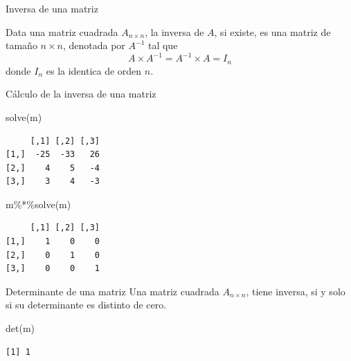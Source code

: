 \documentclass[
  ignorenonframetext,
  aspectratio=169,
  spanish,
]{beamer}
\newenvironment{Shaded}{\begin{snugshade}}{\end{snugshade}}
\newcommand{\FunctionTok}[1]{\textcolor[rgb]{0.28,0.35,0.67}{#1}}
\newcommand{\NormalTok}[1]{\textcolor[rgb]{0.00,0.23,0.31}{#1}}
\newcommand{\SpecialCharTok}[1]{\textcolor[rgb]{0.37,0.37,0.37}{#1}}
\begin{document}
\begin{frame}[fragile]{Inversa de una matriz}
\label{inversa-de-una-matriz}
\begin{tcolorbox}[enhanced jigsaw, breakable, arc=.35mm, title=\textcolor{quarto-callout-note-color}{\faInfo}\hspace{0.5em}{Nota}, coltitle=black, colbacktitle=quarto-callout-note-color!10!white, bottomtitle=1mm, leftrule=.75mm, left=2mm, titlerule=0mm, colback=white, toptitle=1mm, opacitybacktitle=0.6, rightrule=.15mm, opacityback=0, bottomrule=.15mm, toprule=.15mm, colframe=quarto-callout-note-color-frame]

Data una matriz cuadrada \(A_{n\times n}\), la inversa de \(A\), si
existe, es una matriz de tamaño \(n\times n\), denotada por \(A^{-1}\)
tal que \[A\times A^{-1}=A^{-1}\times A=I_n \] donde \(I_n\) es la
identica de orden \(n\).

\end{tcolorbox}

Cálculo de la inversa de una matriz

\begin{Shaded}
\begin{Highlighting}[]
\FunctionTok{solve}\NormalTok{(m)}
\end{Highlighting}
\end{Shaded}

\begin{verbatim}
     [,1] [,2] [,3]
[1,]  -25  -33   26
[2,]    4    5   -4
[3,]    3    4   -3
\end{verbatim}

\begin{Shaded}
\begin{Highlighting}[]
\NormalTok{m}\SpecialCharTok{\%*\%}\FunctionTok{solve}\NormalTok{(m)}
\end{Highlighting}
\end{Shaded}

\begin{verbatim}
     [,1] [,2] [,3]
[1,]    1    0    0
[2,]    0    1    0
[3,]    0    0    1
\end{verbatim}
\end{frame}

\begin{frame}[fragile]{Determinante de una matriz}
\label{determinante-de-una-matriz}
Una matriz cuadrada \(A_{n\times n}\), tiene inversa, si y solo si su
determinante es distinto de cero.

\begin{Shaded}
\begin{Highlighting}[]
\FunctionTok{det}\NormalTok{(m)}
\end{Highlighting}
\end{Shaded}

\begin{verbatim}
[1] 1
\end{verbatim}
\end{frame}
\end{document}
